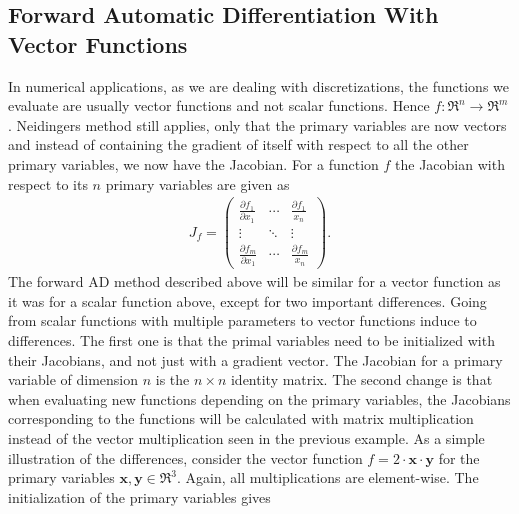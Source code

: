 \subsection{Forward Automatic Differentiation With Vector Functions}
\label{sec:FADWithMultipleParameters}
In numerical applications, as we are dealing with discretizations, the functions we evaluate are usually vector functions and not scalar functions. Hence $f: \Re^n \rightarrow \Re^m$. Neidingers method still applies, only that the primary variables are now vectors and instead of containing the gradient of itself with respect to all the other primary variables, we now have the Jacobian. For a function $f$ the Jacobian with respect to its $n$ primary variables are given as
\begin{align*}
    J_f  =
    \begin{pmatrix}
        \frac{\partial f_1}{\partial x_1} & \dotsb & \frac{\partial f_1}{x_n}\\
        \vdots & \ddots & \vdots \\
        \frac{\partial f_m}{\partial x_1} & \dotsb & \frac{\partial f_m}{x_n}
    \end{pmatrix}.
\end{align*}
The forward AD method described above will be similar for a vector function as it was for a scalar function above, except for two important differences. 
Going from scalar functions with multiple parameters to vector functions induce to differences. The first one is that the primal variables need to be initialized with their Jacobians, and not just with a gradient vector. The Jacobian for a primary variable of dimension $n$ is the $n \times n$ identity matrix. The second change is that when evaluating new functions depending on the primary variables, the Jacobians corresponding to the functions will be calculated with matrix multiplication instead of the vector multiplication seen in the previous example. As a simple illustration of the differences, consider the vector function $f = 2\cdot \textbf{x}\cdot \textbf{y}$ for the primary variables $\textbf{x},\textbf{y}\in \Re^3$. Again, all multiplications are element-wise. The initialization of the primary variables gives
